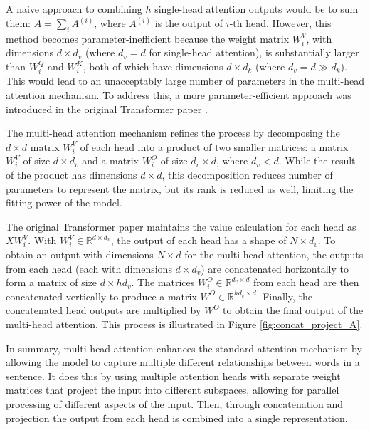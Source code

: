 A naive approach to combining $h$ single-head attention outputs would be to sum them: $A = \sum_i A^{(i)}$, where $A^{(i)}$ is the output of $i$-th head. However, this method becomes parameter-inefficient because the weight matrix $W^V_i$, with dimensions $d \times d_v$ (where $d_v = d$ for single-head attention), is substantially larger than $W^Q_i$ and $W^K_i$, both of which have dimensions $d \times d_k$ (where $d_v = d \gg d_k$). This would lead to an unacceptably large number of parameters in the multi-head attention mechanism. To address this, a more parameter-efficient approach was introduced in the original Transformer paper \cite{vaswani2017attention}.

The multi-head attention mechanism refines the process by decomposing the $d \times d$ matrix $W^V_i$ of each head into a product of two smaller matrices: a matrix $W^V_i$ of size $d \times d_v$ and a matrix $W^O_i$ of size $d_v \times d$, where $d_v < d$. While the result of the product has dimensions $d \times d$, this decomposition reduces number of parameters to represent the matrix, but its rank is reduced as well, limiting the fitting power of the model. 

The original Transformer paper maintains the value calculation for each head as $XW^V_i$. With $W^V_i \in \mathbb{R}^{d \times d_v}$, the output of each head has a shape of $N \times d_v$. To obtain an output with dimensions $N \times d$ for the multi-head attention, the outputs from each head (each with dimensions $d \times d_v$) are concatenated horizontally to form a matrix of size $d \times hd_v$. The matrices $W^O_i \in \mathbb{R}^{d_v \times d}$ from each head are then concatenated vertically to produce a matrix $W^O \in \mathbb{R}^{hd_v \times d}$.  Finally, the concatenated head outputs are multiplied by $W^O$ to obtain the final output of the multi-head attention. This process is illustrated in Figure \ref{fig:concat_project_A}.

In summary, multi-head attention enhances the standard attention mechanism by allowing the model to capture multiple different relationships between words in a sentence. It does this by using multiple attention heads with separate weight matrices that project the input into different subspaces, allowing for parallel processing of different aspects of the input. Then, through concatenation and projection the output from each head is combined into a single representation.


